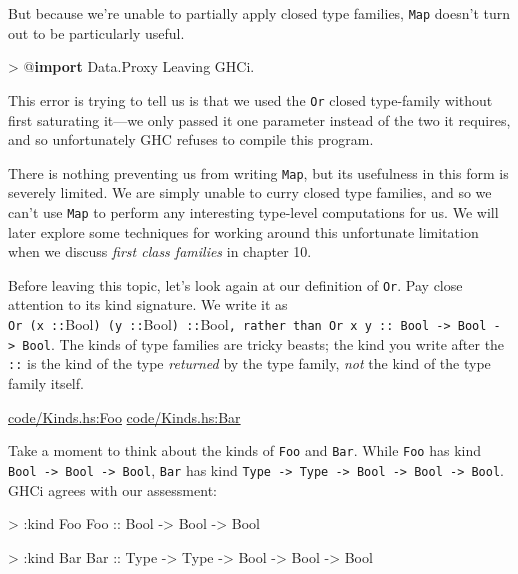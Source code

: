 \documentclass[
  11pt,
]{book}
\newenvironment{Shaded}{}{}
\newcommand{\DataTypeTok}[1]{\textcolor[rgb]{0.56,0.13,0.00}{#1}}
\newcommand{\KeywordTok}[1]{\textcolor[rgb]{0.00,0.44,0.13}{\textbf{#1}}}
\newcommand{\NormalTok}[1]{#1}
\newcommand{\OperatorTok}[1]{\textcolor[rgb]{0.40,0.40,0.40}{#1}}
\newcommand{\OtherTok}[1]{\textcolor[rgb]{0.00,0.44,0.13}{#1}}
\theoremstyle{nonumberplain}
\begin{document}
But because we're unable to partially apply closed type families,
\texttt{Map} doesn't turn out to be particularly useful.

\begin{Shaded}
\begin{Highlighting}[]
\OperatorTok{\textgreater{}} \OperatorTok{@}\KeywordTok{import} \DataTypeTok{Data.Proxy}
\DataTypeTok{Leaving} \DataTypeTok{GHCi}\OperatorTok{.}
\end{Highlighting}
\end{Shaded}

This error is trying to tell us is that we used the \texttt{Or} closed
type-family without first saturating it---we only passed it one
parameter instead of the two it requires, and so unfortunately GHC
refuses to compile this program.

There is nothing preventing us from writing \texttt{Map}, but its
usefulness in this form is severely limited. We are simply unable to
curry closed type families, and so we can't use \texttt{Map} to perform
any interesting type-level computations for us. We will later explore
some techniques for working around this unfortunate limitation when we
discuss \emph{first class families} in chapter 10.

Before leaving this topic, let's look again at our definition of
\texttt{Or}. Pay close attention to its kind signature. We write it as
\texttt{Or\ (x\ ::}Bool\texttt{)\ (y\ ::}Bool\texttt{)\ ::}Bool\texttt{,\ rather\ than\ \textasciigrave{}Or\ x\ y\ ::\ \textasciigrave{}Bool\ -\textgreater{}\ Bool\ -\textgreater{}\ Bool}.
The kinds of type families are tricky beasts; the kind you write after
the \texttt{::} is the kind of the type \emph{returned} by the type
family, \emph{not} the kind of the type family itself.

\href{Snip}{code/Kinds.hs:Foo} \href{Snip}{code/Kinds.hs:Bar}

Take a moment to think about the kinds of \texttt{Foo} and \texttt{Bar}.
While \texttt{Foo} has kind
\texttt{Bool\ -\textgreater{}\ Bool\ -\textgreater{}\ Bool},
\texttt{Bar} has kind
\texttt{Type\ -\textgreater{}\ Type\ -\textgreater{}\ Bool\ -\textgreater{}\ Bool\ -\textgreater{}\ Bool}.
GHCi agrees with our assessment:

\begin{Shaded}
\begin{Highlighting}[]
\OperatorTok{\textgreater{}} \OperatorTok{:}\NormalTok{kind }\DataTypeTok{Foo}
\DataTypeTok{Foo}\OtherTok{ ::} \DataTypeTok{Bool} \OtherTok{{-}\textgreater{}} \DataTypeTok{Bool} \OtherTok{{-}\textgreater{}} \DataTypeTok{Bool}


\OperatorTok{\textgreater{}} \OperatorTok{:}\NormalTok{kind }\DataTypeTok{Bar}
\DataTypeTok{Bar}\OtherTok{ ::} \DataTypeTok{Type} \OtherTok{{-}\textgreater{}} \DataTypeTok{Type} \OtherTok{{-}\textgreater{}} \DataTypeTok{Bool} \OtherTok{{-}\textgreater{}} \DataTypeTok{Bool} \OtherTok{{-}\textgreater{}} \DataTypeTok{Bool}
\end{Highlighting}
\end{Shaded}
\end{document}
